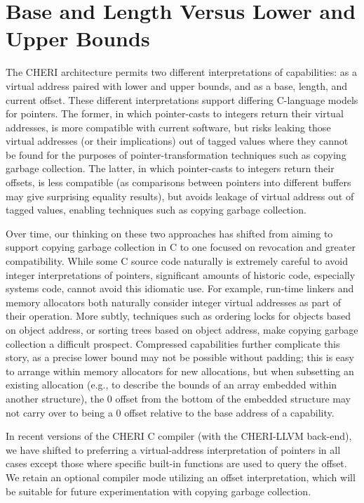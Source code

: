 \section{Base and Length Versus Lower and Upper Bounds}

The CHERI architecture permits two different interpretations of capabilities:
as a virtual address paired with lower and upper bounds, and as a base,
length, and current offset.
These different interpretations support differing C-language models for
pointers.
The former, in which pointer-casts to integers return their virtual addresses,  is more compatible with current software, but risks leaking those virtual
addresses (or their implications) out of tagged values where they cannot be
found for the purposes of pointer-transformation techniques such as copying
garbage collection.
The latter, in which pointer-casts to integers return their offsets, is less
compatible (as comparisons between pointers into different buffers may give
surprising equality results), but avoids leakage of virtual address out of
tagged values, enabling techniques such as copying garbage collection.

Over time, our thinking on these two approaches has shifted from aiming to
support copying garbage collection in C to one focused on revocation and
greater compatibility.
While some C source code naturally is extremely careful to avoid integer
interpretations of pointers, significant amounts of historic code, especially
systems code, cannot avoid this idiomatic use.
For example, run-time linkers and memory allocators both naturally consider
integer virtual addresses as part of their operation.
More subtly, techniques such as ordering locks for objects based on object
address, or sorting trees based on object address, make copying garbage
collection a difficult prospect.
Compressed capabilities further complicate this story, as a precise lower
bound may not be possible without padding; this is easy to arrange within
memory allocators for new allocations, but when subsetting an existing
allocation (e.g., to describe the bounds of an array embedded within another
structure), the 0 offset from the bottom of the embedded structure may not
carry over to being a 0 offset relative to the base address of a capability.

In recent versions of the CHERI C compiler (with the CHERI-LLVM
back-end), we have shifted to preferring a virtual-address
interpretation of pointers in all cases except those where specific
built-in functions are used to query the offset.  We retain an
optional compiler mode utilizing an offset interpretation, which will
be suitable for future experimentation with copying garbage
collection.


